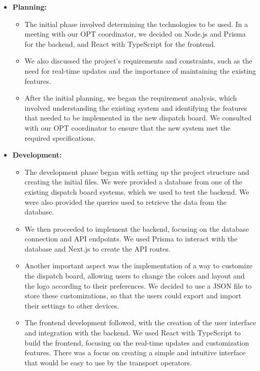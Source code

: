 \documentclass[10pt]{article}
\begin{document}
        \begin{itemize}
            \item \textbf{Planning:}
            \begin{itemize}
                \item     The initial phase involved determining the technologies to be used. In a meeting with our OPT coordinator, we decided on Node.js and Prisma for the backend, and React with TypeScript for the frontend.
                \item     We also discussed the project's requirements and constraints, such as the need for real-time updates and the importance of maintaining the existing features.
                \item     After the initial planning, we began the requirement analysis, which involved understanding the existing system and identifying the features that needed to be implemented in the new dispatch board. We consulted with our OPT coordinator to ensure that the new system met the required specifications.
            \end{itemize}
            \item \textbf{Development:}
            \begin{itemize}
                \item     The development phase began with setting up the project structure and creating the initial files. We were provided a database from one of the existing dispatch board systems, which we used to test the backend. We were also provided the queries used to retrieve the data from the database.
                \item     We then proceeded to implement the backend, focusing on the database connection and API endpoints. We used Prisma to interact with the database and Next.js to create the API routes.
                \item     Another important aspect was the implementation of a way to customize the dispatch board, allowing users to change the colors and layout and the logo according to their preferences. We decided to use a JSON file to store these customizations, so that the users could export and import their settings to other devices.
                \item     The frontend development followed, with the creation of the user interface and integration with the backend. We used React with TypeScript to build the frontend, focusing on the real-time updates and customization features. There was a focus on creating a simple and intuitive interface that would be easy to use by the transport operators.

\end{itemize}
\end{itemize}
\end{document}
